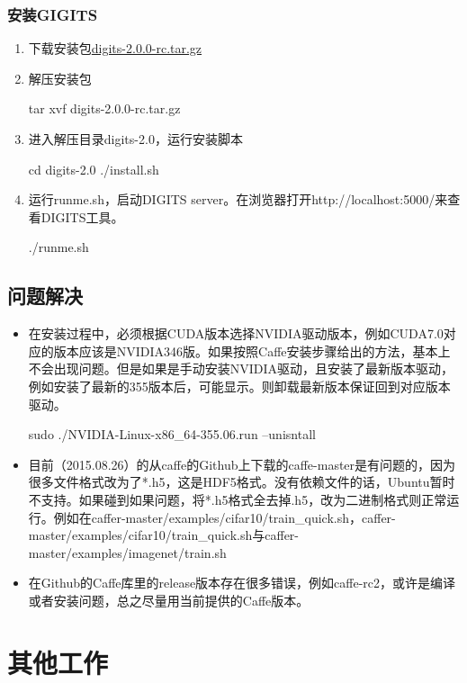 \subsubsection{安装GIGITS}
\begin{enumerate}
\item 下载安装包\href{https://developer.nvidia.com/digits}{digits-2.0.0-rc.tar.gz}
\item 解压安装包
\begin{bash}
tar xvf digits-2.0.0-rc.tar.gz
\end{bash}
\item 进入解压目录digits-2.0，运行安装脚本
\begin{bash}
cd digits-2.0
./install.sh
\end{bash}
\item 运行runme.sh，启动DIGITS server。在浏览器打开http://localhost:5000/来查看DIGITS工具。
\begin{bash}
./runme.sh
\end{bash}
\end{enumerate}

\subsection{问题解决}
\begin{itemize}
\item 在安装过程中，必须根据CUDA版本选择NVIDIA驱动版本，例如CUDA7.0对应的版本应该是NVIDIA346版。如果按照Caffe安装步骤给出的方法，基本上不会出现问题。但是如果是手动安装NVIDIA驱动，且安装了最新版本驱动，例如安装了最新的355版本后，可能显示{\color{blue}{no CUDA-capable device is detected}}。则卸载最新版本保证回到对应版本驱动。
\begin{bash}
sudo ./NVIDIA-Linux-x86_64-355.06.run --unisntall
\end{bash}
\item 目前（2015.08.26）的从caffe的Github上下载的caffe-master是有问题的，因为很多文件格式改为了*.h5，这是HDF5格式。没有依赖文件的话，Ubuntu暂时不支持。如果碰到如果问题，将*.h5格式全去掉.h5，改为二进制格式则正常运行。例如在caffer-master/examples/cifar10/train\_quick.sh，caffer-master/examples/cifar10/train\_quick.sh与caffer-master/examples/imagenet/train.sh
\item 在Github的Caffe库里的release版本存在很多错误，例如caffe-rc2，或许是编译或者安装问题，总之尽量用当前提供的Caffe版本。
\end{itemize}

\section{其他工作}
